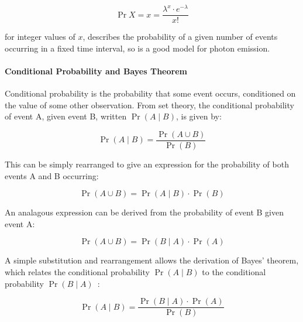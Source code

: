 \begin{equation}
\Pr{X = x} = \frac{\lambda^x \cdot e^{-\lambda}}{x!}
\label{eq:poisson}
\end{equation}
 
for integer values of $x$, describes the probability of a given number of events occurring in a fixed time interval, so is a good model for photon emission. 



\paragraph{Conditional Probability and Bayes Theorem}
Conditional probability is the probability that some event occurs, conditioned on the value of some other observation. From set theory, the conditional probability of event A, given event B, written $\Pr(A \mid B)$, is given by: 

\begin{equation}
\Pr(A \mid B) = \frac{\Pr(A \cup B)}{\Pr(B)}
\label{eq:conditional}
\end{equation}

This can be simply rearranged to give an expression for the probability of both events A and B occurring:

\begin{equation}
\Pr(A \cup B) = \Pr(A \mid B) \cdot \Pr(B) 
\label{eq:conditional_and}
\end{equation}

An analagous expression can be derived from the probability of event B given event A:


\begin{equation}
\Pr(A \cup B) = \Pr(B \mid A) \cdot \Pr(A) 
\label{eq:conditional_and}
\end{equation}

A simple substitution and rearrangement allows the derivation of Bayes' theorem, which relates the conditional probability $\Pr(A \mid B)$ to the conditional probability $\Pr(B \mid A)$~\cite{barberBRML2012}:

\begin{equation}
\Pr(A \mid B) = \frac{\Pr(B \mid A) \cdot \Pr(A)}{\Pr(B)} 
\label{eq:bayes}
\end{equation}
 
